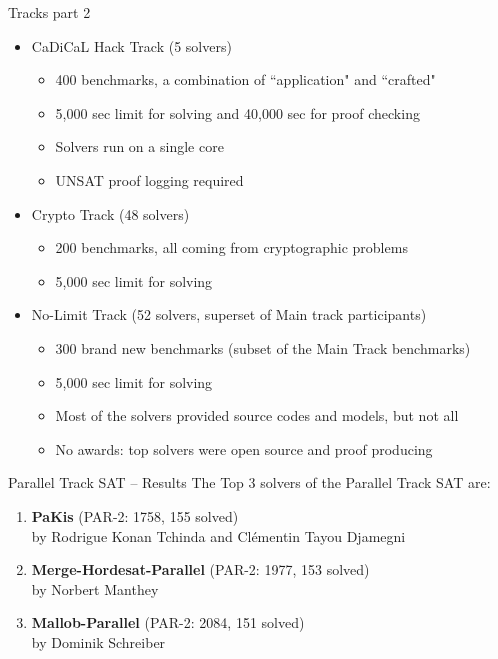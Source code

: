 \documentclass{beamer}
\begin{document}
\begin{frame}{Tracks part 2}
\begin{itemize}
\item CaDiCaL Hack Track (5 solvers)
\begin{itemize}
\item 400 benchmarks, a combination of ``application" and ``crafted"
\item 5,000 sec limit for solving and 40,000 sec for proof checking
\item Solvers run on a single core
\item UNSAT proof logging required
\end{itemize}
\pause
\medskip
\item Crypto Track (48 solvers)
\begin{itemize}
\item 200 benchmarks, all coming from cryptographic problems
\item 5,000 sec limit for solving
\end{itemize}
\pause
\medskip
\item No-Limit Track (52 solvers, superset of Main track participants)
\begin{itemize}
\item 300 brand new benchmarks (subset of the Main Track benchmarks)
\item 5,000 sec limit for solving
\item Most of the solvers provided source codes and models, but not all
\item No awards: top solvers were open source and proof producing
\end{itemize}
\end{itemize}
\end{frame}


\begin{frame}{Parallel Track SAT -- Results}
The Top 3 solvers of the Parallel Track SAT are:
\begin{enumerate}
\item[1]<4-> {\bf PaKis} (PAR-2: 1758, 155 solved)\\
by Rodrigue Konan Tchinda and Clémentin Tayou Djamegni
\item[2]<3-> {\bf Merge-Hordesat-Parallel} (PAR-2: 1977, 153 solved)\\
by Norbert Manthey
\item[3]<2-> {\bf Mallob-Parallel} (PAR-2: 2084, 151 solved)\\
by Dominik Schreiber
\end{enumerate}
\end{frame}
\end{document}
